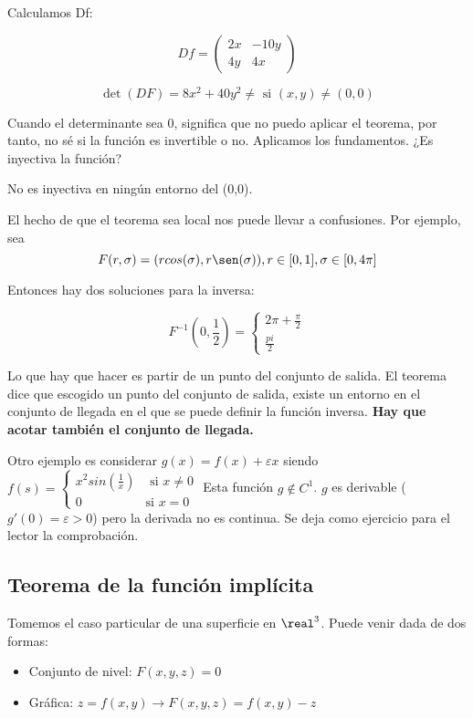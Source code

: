 Calculamos Df:

$$Df = \begin{pmatrix}
        2x&-10y\\
        4y & 4x 
       \end{pmatrix}
$$

$$\det(DF) = 8x^2 + 40y^2 \neq \text{ si } (x,y) \neq (0,0)$$

Cuando el determinante sea 0, significa que no puedo aplicar el teorema, por tanto, no sé si la función es invertible o no. Aplicamos los fundamentos. ¿Es inyectiva la función?

No es inyectiva en ningún entorno del (0,0).

El hecho de que el teorema sea local nos puede llevar a confusiones. Por ejemplo, sea \[ F (r,\sigma) = (rcos(\sigma),r\sen(\sigma)), r \in [0,1], \sigma \in [0,4\pi]\]

Entonces hay dos soluciones para la inversa:

\[ F^{-1} (0,\frac{1}{2}) = \left\{\begin{matrix}2\pi+\frac{\pi}{2}\\\frac{pi}{2}\end{matrix}\right. \]

Lo que hay que hacer es partir de un punto del conjunto de salida. El teorema dice que escogido un punto del conjunto de salida, existe un entorno en el conjunto de llegada en el que se puede definir la función inversa. \textbf{Hay que acotar también el conjunto de llegada.}

Otro ejemplo es considerar  $g(x) = f(x) + \varepsilon x$ siendo $f(s) =\left\{\begin{matrix}x^2sin\left(\frac{1}{x}\right)& \text{ si } x\neq0\\0 &\text{si } x=0\end{matrix}\right.$
Esta función $g \notin C^1$. $g$ es derivable ($g'(0) = \varepsilon>0$) pero la derivada no es continua. Se deja como ejercicio para el lector la comprobación.      

\subsection{Teorema de la función implícita}

Tomemos el caso particular de una superficie en $\real^3$. Puede venir dada de dos formas:
\begin{itemize}
 \item Conjunto de nivel: $F(x,y,z) = 0$
 \item Gráfica: $z=f(x,y) \rightarrow F(x,y,z) = f(x,y)-z$
\end{itemize}

